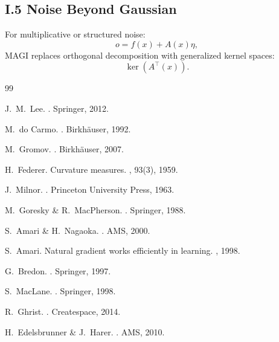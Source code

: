 \documentclass[11pt,a4paper,twocolumn]{article}
\begin{document}
\subsection*{I.5 Noise Beyond Gaussian}

For multiplicative or structured noise:
\[
o = f(x) + A(x)\eta,
\]
MAGI replaces orthogonal decomposition with generalized kernel spaces:
\[
\ker(A^\top(x)).
\]



\begin{thebibliography}{99}

J.~M.~Lee.
.
\newblock Springer, 2012.

M.~do Carmo.
.
\newblock Birkhäuser, 1992.

M.~Gromov.
.
\newblock Birkhäuser, 2007.

H.~Federer.
\newblock Curvature measures.
, 93(3), 1959.

J.~Milnor.
.
\newblock Princeton University Press, 1963.

M.~Goresky \& R.~MacPherson.
.
\newblock Springer, 1988.

S.~Amari \& H.~Nagaoka.
.
\newblock AMS, 2000.

S.~Amari.
\newblock Natural gradient works efficiently in learning.
, 1998.

G.~Bredon.
.
\newblock Springer, 1997.

S.~MacLane.
.
\newblock Springer, 1998.

R.~Ghrist.
.
\newblock Createspace, 2014.

H.~Edelsbrunner \& J.~Harer.
.
\newblock AMS, 2010.


\end{thebibliography}
\end{document}
